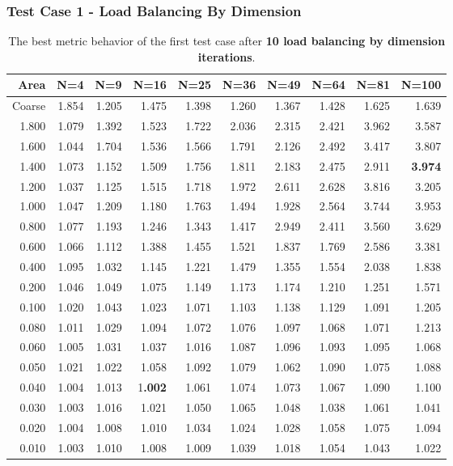 \documentclass[compress]{beamer}
\begin{document}
\begin{frame}[t]\frametitle{Test Case 1 - Load Balancing By Dimension}
\begin{table}[H]
\tiny
\centering
\caption{The best metric behavior of the first test case after \textbf{10 load balancing by dimension iterations}.} 
\begin{tabular}{rrrrrrrrrr}
 \hline
 Area & N=4 & N=9 & N=16 & N=25 & N=36 & N=49 & N=64 & N=81 & N=100 \\ 
\hline
 Coarse & 1.854 & 1.205 & 1.475 & 1.398 & 1.260 & 1.367 & 1.428 & 1.625 & 1.639 \\
  1.800 & 1.079 & 1.392 & 1.523 & 1.722 & 2.036 & 2.315 & 2.421 & 3.962 & 3.587 \\
  1.600 & 1.044 & 1.704 & 1.536 & 1.566 & 1.791 & 2.126 & 2.492 & 3.417 & 3.807 \\
  1.400 & 1.073 & 1.152 & 1.509 & 1.756 & 1.811 & 2.183 & 2.475 & 2.911 & \textbf{\cellcolor{blue!25}3.974} \\
  1.200 & 1.037 & 1.125 & 1.515 & 1.718 & 1.972 & 2.611 & 2.628 & 3.816 & 3.205 \\
  1.000 & 1.047 & 1.209 & 1.180 & 1.763 & 1.494 & 1.928 & 2.564 & 3.744 & 3.953 \\
  0.800 & 1.077 & 1.193 & 1.246 & 1.343 & 1.417 & 2.949 & 2.411 & 3.560 & 3.629 \\
  0.600 & 1.066 & 1.112 & 1.388 & 1.455 & 1.521 & 1.837 & 1.769 & 2.586 & 3.381 \\
  0.400 & 1.095 & 1.032 & 1.145 & 1.221 & 1.479 & 1.355 & 1.554 & 2.038 & 1.838 \\
  0.200 & 1.046 & 1.049 & 1.075 & 1.149 & 1.173 & 1.174 & 1.210 & 1.251 & 1.571 \\
  0.100 & 1.020 & 1.043 & 1.023 & 1.071 & 1.103 & 1.138 & 1.129 & 1.091 & 1.205 \\
  0.080 & 1.011 & 1.029 & 1.094 & 1.072 & 1.076 & 1.097 & 1.068 & 1.071 & 1.213 \\
  0.060 & 1.005 & 1.031 & 1.037 & 1.016 & 1.087 & 1.096 & 1.093 & 1.095 & 1.068 \\
  0.050 & 1.021 & 1.022 & 1.058 & 1.092 & 1.079 & 1.062 & 1.090 & 1.075 & 1.088 \\
  0.040 & 1.004 & 1.013 & 1\textbf{\cellcolor{blue!25}.002} & 1.061 & 1.074 & 1.073 & 1.067 & 1.090 & 1.100 \\
  0.030 & 1.003 & 1.016 & 1.021 & 1.050 & 1.065 & 1.048 & 1.038 & 1.061 & 1.041 \\
  0.020 & 1.004 & 1.008 & 1.010 & 1.034 & 1.024 & 1.028 & 1.058 & 1.075 & 1.094 \\
  0.010 & 1.003 & 1.010 & 1.008 & 1.009 & 1.039 & 1.018 & 1.054 & 1.043 & 1.022 \\
\hline
\end{tabular}
\end{table}
\end{frame}
\end{document}

